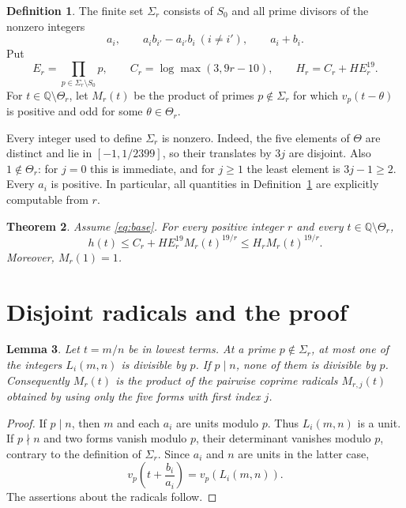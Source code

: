 \documentclass[11pt,a4paper]{article}
\newtheorem{theorem}{Theorem}[section]
\newtheorem{lemma}[theorem]{Lemma}
\theoremstyle{definition}\newtheorem{definition}[theorem]{Definition}
\newcommand{\Q}{\mathbb Q}\newcommand{\Z}{\mathbb Z}
\begin{document}
\begin{definition}\label{def:exceptional}
The finite set $\Sigma_r$ consists of $S_0$ and all prime divisors of
the nonzero integers
\[
 a_i,\qquad a_i b_{i'}-a_{i'}b_i\ (i\ne i'),\qquad a_i+b_i.
\]
Put
\[
 E_r=\prod_{p\in\Sigma_r\setminus S_0}p,\qquad
 C_r=\log\max(3,9r-10),\qquad H_r=C_r+HE_r^{19}.
\]
For $t\in\Q\setminus\Theta_r$, let $M_r(t)$ be the product of
primes $p\notin\Sigma_r$ for which
$v_p(t-\theta)$ is positive and odd for some $\theta\in\Theta_r$.
\end{definition}

Every integer used to define $\Sigma_r$ is nonzero.
Indeed, the five elements of $\Theta$ are distinct and lie in
$[-1,1/2399]$, so their translates by $3j$ are disjoint.
Also $1\notin\Theta_r$: for $j=0$ this is immediate, and for $j\ge1$
the least element is $3j-1\ge2$. Every $a_i$ is positive.
In particular, all quantities in Definition~\ref{def:exceptional}
are explicitly computable from $r$.

\begin{theorem}\label{thm:amplification}
Assume \eqref{eq:base}. For every positive integer $r$ and every
$t\in\Q\setminus\Theta_r$,
\begin{equation}\label{eq:amplified}
 h(t)\le C_r+HE_r^{19}M_r(t)^{19/r}
       \le H_r M_r(t)^{19/r}.
\end{equation}
Moreover, $M_r(1)=1$.
\end{theorem}

\section{Disjoint radicals and the proof}

\begin{lemma}\label{lem:disjoint}
Let $t=m/n$ be in lowest terms. At a prime $p\notin\Sigma_r$,
at most one of the integers $L_i(m,n)$ is divisible by $p$.
If $p\mid n$, none of them is divisible by $p$.
Consequently $M_r(t)$ is the product of the pairwise coprime
radicals $M_{r,j}(t)$ obtained by using only the five forms with
first index $j$.
\end{lemma}
\begin{proof}
If $p\mid n$, then $m$ and each $a_i$ are units modulo $p$.
Thus $L_i(m,n)$ is a unit. If $p\nmid n$ and two forms vanish
modulo $p$, their determinant vanishes modulo $p$, contrary to
the definition of $\Sigma_r$. Since $a_i$ and $n$ are units in
the latter case,
\[
 v_p\!\left(t+\frac{b_i}{a_i}\right)=v_p(L_i(m,n)).
\]
The assertions about the radicals follow.
\end{proof}
\end{document}
